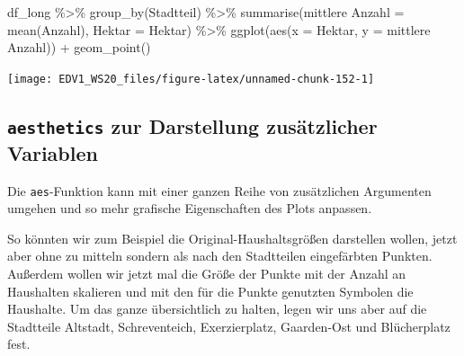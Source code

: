 \documentclass[
]{book}
\newenvironment{Shaded}{\begin{snugshade}}{\end{snugshade}}
\newcommand{\AttributeTok}[1]{\textcolor[rgb]{0.77,0.63,0.00}{#1}}
\newcommand{\FunctionTok}[1]{\textcolor[rgb]{0.00,0.00,0.00}{#1}}
\newcommand{\NormalTok}[1]{#1}
\newcommand{\OtherTok}[1]{\textcolor[rgb]{0.56,0.35,0.01}{#1}}
\newcommand{\SpecialCharTok}[1]{\textcolor[rgb]{0.00,0.00,0.00}{#1}}
\newcommand{\StringTok}[1]{\textcolor[rgb]{0.31,0.60,0.02}{#1}}
\begin{document}
\begin{Shaded}
\begin{Highlighting}[]
\NormalTok{df\_long }\SpecialCharTok{\%\textgreater{}\%} 
  \FunctionTok{group\_by}\NormalTok{(Stadtteil) }\SpecialCharTok{\%\textgreater{}\%} 
  \FunctionTok{summarise}\NormalTok{(}\StringTok{\textasciigrave{}}\AttributeTok{mittlere Anzahl}\StringTok{\textasciigrave{}} \OtherTok{=} \FunctionTok{mean}\NormalTok{(Anzahl),}
            \AttributeTok{Hektar =}\NormalTok{ Hektar) }\SpecialCharTok{\%\textgreater{}\%} 
  \FunctionTok{ggplot}\NormalTok{(}\FunctionTok{aes}\NormalTok{(}\AttributeTok{x =}\NormalTok{ Hektar,}
             \AttributeTok{y =} \StringTok{\textasciigrave{}}\AttributeTok{mittlere Anzahl}\StringTok{\textasciigrave{}}\NormalTok{)) }\SpecialCharTok{+}
  \FunctionTok{geom\_point}\NormalTok{()}
\end{Highlighting}
\end{Shaded}

\begin{center}\texttt{[image: EDV1\_WS20\_files/figure-latex/unnamed-chunk-152-1]} \end{center}

\hypertarget{aesthetics-zur-darstellung-zusuxe4tzlicher-variablen}{%
\subsection{\texorpdfstring{\texttt{aesthetics} zur Darstellung zusätzlicher Variablen}{aesthetics zur Darstellung zusätzlicher Variablen}}\label{aesthetics-zur-darstellung-zusuxe4tzlicher-variablen}}

Die \texttt{aes}-Funktion kann mit einer ganzen Reihe von zusätzlichen Argumenten umgehen und so mehr grafische Eigenschaften des Plots anpassen.

So könnten wir zum Beispiel die Original-Haushaltsgrößen darstellen wollen, jetzt aber ohne zu mitteln sondern als nach den Stadtteilen eingefärbten Punkten. Außerdem wollen wir jetzt mal die Größe der Punkte mit der Anzahl an Haushalten skalieren und mit den für die Punkte genutzten Symbolen die Haushalte.
Um das ganze übersichtlich zu halten, legen wir uns aber auf die Stadtteile Altstadt, Schreventeich, Exerzierplatz, Gaarden-Ost und Blücherplatz fest.
\end{document}
